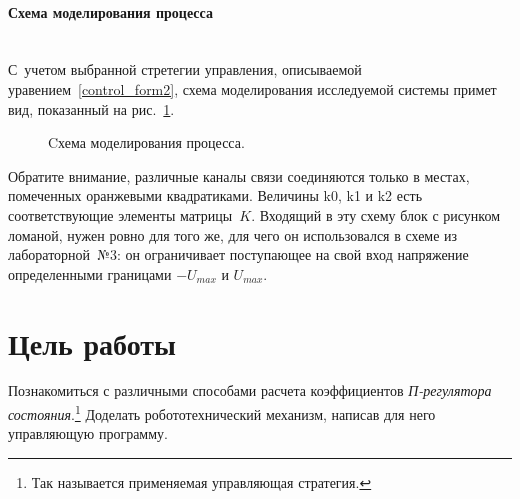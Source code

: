 \documentclass[12pt,a4paper,openany]{extarticle}
\begin{document}
\paragraph*{Схема моделирования процесса}$\phantom{-}$ \\
\hspace*{\parindent}С~учетом выбранной стретегии управления, описываемой уравением~\eqref{control_form2}, схема моделирования исследуемой системы примет вид, показанный на рис.~\ref{struct_sheme}.
\begin{figure}[h]
	\caption{Cхема моделирования процесса.}
	\label{struct_sheme}
\end{figure}

Обратите внимание, различные каналы связи соединяются только в местах, помеченных оранжевыми квадратиками.
Величины k0, k1 и k2 есть соответствующие элементы матрицы~$K$.
Входящий в эту схему блок с рисунком ломаной, нужен ровно для того же, для чего он использовался в схеме из лабораторной~№3: он ограничивает поступающее на свой вход напряжение определенными границами $-U_{max}$ и $U_{max}$. 

\newpage
\section{Цель работы}
Познакомиться с различными способами расчета коэффициентов \textit{П-регулятора состояния}\lefteqn.\footnote{Так называется применяемая управляющая стратегия.}
Доделать робототехнический механизм, написав для него управляющую программу.
\end{document}
